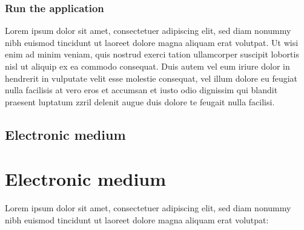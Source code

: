 \subsection{Run the application}
Lorem ipsum dolor sit amet, consectetuer adipiscing elit, sed diam nonummy nibh euismod tincidunt ut laoreet dolore magna aliquam erat volutpat. Ut wisi enim ad minim veniam, quis nostrud exerci tation ullamcorper suscipit lobortis nisl ut aliquip ex ea commodo consequat. Duis autem vel eum iriure dolor in hendrerit in vulputate velit esse molestie consequat, vel illum dolore eu feugiat nulla facilisis at vero eros et accumsan et iusto odio dignissim qui blandit praesent luptatum zzril delenit augue duis dolore te feugait nulla facilisi.
\\
\newpage
{}
{
	\section{Electronic medium}
}
{
	\chapter{Electronic medium}
}
Lorem ipsum dolor sit amet, consectetuer adipiscing elit, sed diam nonummy nibh euismod tincidunt ut laoreet dolore magna aliquam erat volutpat:
